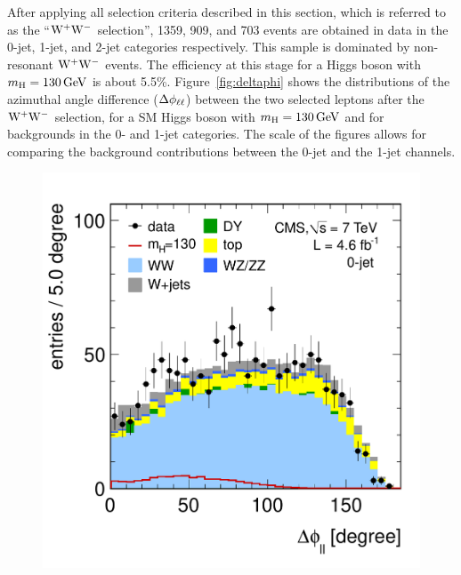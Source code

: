 \documentclass[11pt,twoside,a4paper,cmspaper,final,collab]{cms-tdr}
\begin{document}
After applying all selection criteria described in this section, which is referred to
as the ``$\mathrm{W^+}{}\mathrm{W^-}$ selection'', 1359, 909, and 703 events are obtained in data in the
0-jet, 1-jet, and 2-jet categories respectively. This sample is
dominated by non-resonant $\mathrm{W^+}{}\mathrm{W^-}$ events. The efficiency at this stage for a
Higgs boson with $m_{\mathrm{H}} =130\,\text{Ge\hspace{-.08em}V}$ is about 5.5\%.
Figure~\ref{fig:deltaphi} shows the distributions of the azimuthal angle
difference ($\Delta\phi_{\mathrm{\ell}\mathrm{\ell}}$) between the two selected leptons
after the $\mathrm{W^+}{}\mathrm{W^-}$ selection, for a SM Higgs boson with $m_{\mathrm{H}}=130\,\text{Ge\hspace{-.08em}V}$
and for backgrounds in the 0- and 1-jet categories. The scale of the figures
allows for comparing the background contributions between the 0-jet and the 1-jet channels.

\begin{figure}[htbp]
\begin{center}
  \includegraphics[width=\cmsFigWidth]{ww_0j_deltaphill}

\end{center}
\end{figure}
\end{document}
